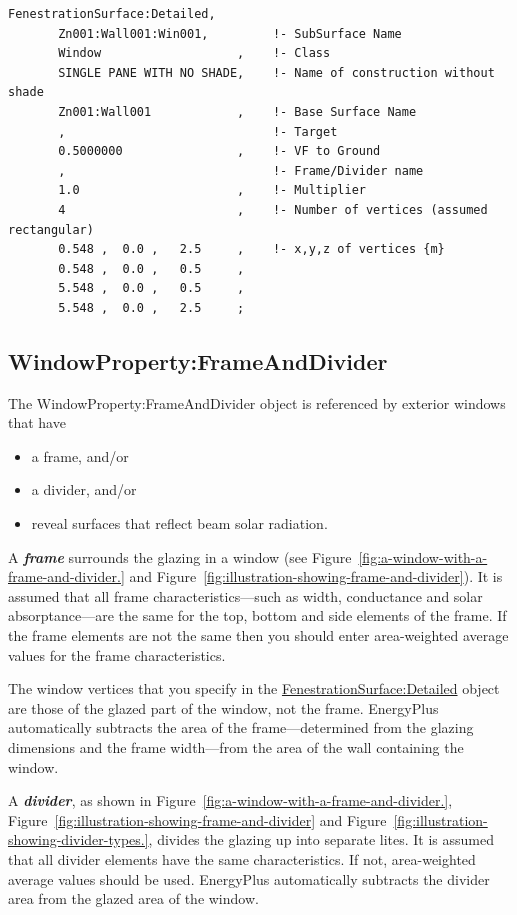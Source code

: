 \begin{lstlisting}
FenestrationSurface:Detailed,
       Zn001:Wall001:Win001,         !- SubSurface Name
       Window                   ,    !- Class
       SINGLE PANE WITH NO SHADE,    !- Name of construction without shade
       Zn001:Wall001            ,    !- Base Surface Name
       ,                             !- Target
       0.5000000                ,    !- VF to Ground
       ,                             !- Frame/Divider name
       1.0                      ,    !- Multiplier
       4                        ,    !- Number of vertices (assumed rectangular)
       0.548 ,  0.0 ,   2.5     ,    !- x,y,z of vertices {m}
       0.548 ,  0.0 ,   0.5     ,
       5.548 ,  0.0 ,   0.5     ,
       5.548 ,  0.0 ,   2.5     ;
\end{lstlisting}

\subsection{WindowProperty:FrameAndDivider}\label{windowpropertyframeanddivider}

The WindowProperty:FrameAndDivider object is referenced by exterior windows that have

\begin{itemize}
\item
  a frame, and/or
\item
  a divider, and/or
\item
  reveal surfaces that reflect beam solar radiation.
\end{itemize}

A \textbf{\emph{frame}} surrounds the glazing in a window (see Figure~\ref{fig:a-window-with-a-frame-and-divider.} and Figure~\ref{fig:illustration-showing-frame-and-divider}). It is assumed that all frame characteristics---such as width, conductance and solar absorptance---are the same for the top, bottom and side elements of the frame. If the frame elements are not the same then you should enter area-weighted average values for the frame characteristics.

The window vertices that you specify in the \hyperref[fenestrationsurfacedetailed]{FenestrationSurface:Detailed} object are those of the glazed part of the window, not the frame. EnergyPlus automatically subtracts the area of the frame---determined from the glazing dimensions and the frame width---from the area of the wall containing the window.

A \textbf{\emph{divider}}, as shown in Figure~\ref{fig:a-window-with-a-frame-and-divider.}, Figure~\ref{fig:illustration-showing-frame-and-divider} and Figure~\ref{fig:illustration-showing-divider-types.}, divides the glazing up into separate lites. It is assumed that all divider elements have the same characteristics. If not, area-weighted average values should be used. EnergyPlus automatically subtracts the divider area from the glazed area of the window.

